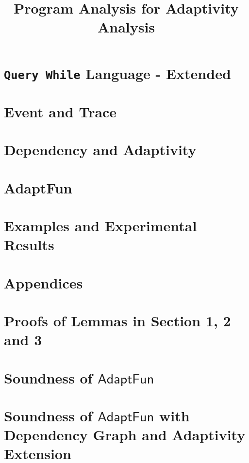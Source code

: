 \documentclass[a4paper,11pt]{article}
\newcommand{\highlight}[1]{\textcolor[rgb]{.0,0.0,1.0}{ #1}}
\newcommand{\THESYSTEM}{\textsf{AdaptFun}}
\begin{document}
\title{Program Analysis for Adaptivity Analysis}

\author{}

\date{}

\maketitle
%
\tableofcontents

% 
\section{\highlight{{\tt Query While} Language - Extended}}

\clearpage
\section{Event and Trace}


\clearpage
\section{\highlight{Dependency and Adaptivity}}


% 
\clearpage
\section{\THESYSTEM}
\label{sec:adpfun}



\clearpage
%
\section{Examples and Experimental Results}


%
\clearpage
\appendix
{}
\section*{Appendices}
\section{Proofs of Lemmas in Section 1, 2 and 3}
\label{apdx:lemma_sec123}

\clearpage
\section{Soundness of $\THESYSTEM$ }
\label{apdx:adapt_soundness}

\clearpage
\section{Soundness of $\THESYSTEM$ \highlight{with Dependency Graph and Adaptivity Extension} }
\label{apdx:adapt_soundness_extend}

\clearpage
\end{document}

